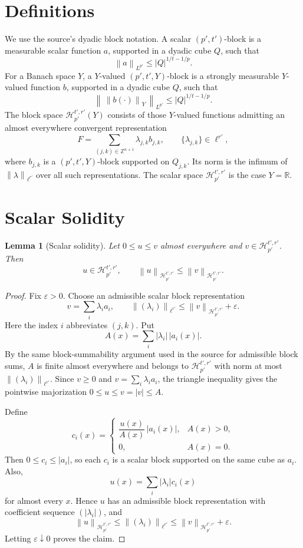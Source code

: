 \documentclass[11pt]{article}
\newtheorem{lemma}[theorem]{Lemma}
\newcommand{\R}{\mathbb{R}}
\newcommand{\Hsp}{\mathcal{H}_{p'}^{t',r'}}
\newcommand{\norm}[1]{\left\|#1\right\|}
\begin{document}
\section*{Definitions}

We use the source's dyadic block notation. A scalar \((p',t')\)-block is a
measurable scalar function \(a\), supported in a dyadic cube \(Q\), such that
\[
\norm{a}_{L^{p'}}\leq |Q|^{1/t-1/p}.
\]
For a Banach space \(Y\), a \(Y\)-valued \((p',t',Y)\)-block is a strongly
measurable \(Y\)-valued function \(b\), supported in a dyadic cube \(Q\), such
that
\[
\norm{\,\norm{b(\cdot)}_Y\,}_{L^{p'}}\leq |Q|^{1/t-1/p}.
\]
The block space \(\Hsp(Y)\) consists of those \(Y\)-valued functions admitting
an almost everywhere convergent representation
\[
F=\sum_{(j,k)\in \mathbb Z^{n+1}}\lambda_{j,k} b_{j,k},
\qquad \{\lambda_{j,k}\}\in \ell^{r'},
\]
where \(b_{j,k}\) is a \((p',t',Y)\)-block supported on \(Q_{j,k}\). Its norm is
the infimum of \(\norm{\lambda}_{\ell^{r'}}\) over all such representations.
The scalar space \(\Hsp\) is the case \(Y=\R\).

\section*{Scalar Solidity}

\begin{lemma}[Scalar solidity]
Let \(0\leq u\leq v\) almost everywhere and \(v\in\Hsp\). Then
\[
u\in\Hsp,\qquad \norm{u}_{\Hsp}\leq \norm{v}_{\Hsp}.
\]
\end{lemma}

\begin{proof}
Fix \(\varepsilon>0\). Choose an admissible scalar block representation
\[
v=\sum_i \lambda_i a_i,\qquad
\norm{(\lambda_i)}_{\ell^{r'}}\leq \norm{v}_{\Hsp}+\varepsilon .
\]
Here the index \(i\) abbreviates \((j,k)\). Put
\[
A(x)=\sum_i |\lambda_i|\, |a_i(x)|.
\]
By the same block-summability argument used in the source for admissible block
sums, \(A\) is finite almost everywhere and belongs to \(\Hsp\) with norm at
most \(\norm{(\lambda_i)}_{\ell^{r'}}\). Since \(v\geq0\) and
\(v=\sum_i\lambda_i a_i\), the triangle inequality gives the pointwise
majorization \(0\leq u\leq v=|v|\leq A\).

Define
\[
c_i(x)=
\begin{cases}
\dfrac{u(x)}{A(x)}\, |a_i(x)|, & A(x)>0,\\[0.8em]
0, & A(x)=0.
\end{cases}
\]
Then \(0\leq c_i\leq |a_i|\), so each \(c_i\) is a scalar block supported on
the same cube as \(a_i\). Also,
\[
u(x)=\sum_i |\lambda_i| c_i(x)
\]
for almost every \(x\). Hence \(u\) has an admissible block representation with
coefficient sequence \((|\lambda_i|)\), and
\[
\norm{u}_{\Hsp}\leq \norm{(\lambda_i)}_{\ell^{r'}}
\leq \norm{v}_{\Hsp}+\varepsilon .
\]
Letting \(\varepsilon\downarrow0\) proves the claim.
\end{proof}
\end{document}
